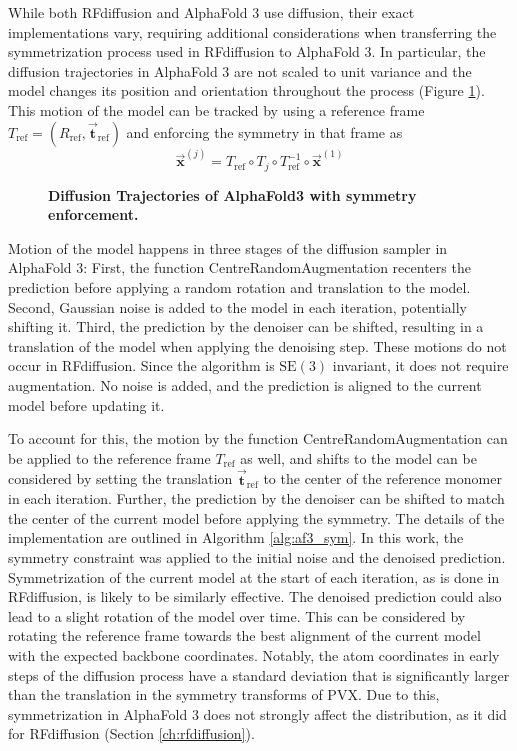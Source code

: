 While both RFdiffusion and AlphaFold 3 use diffusion, their exact implementations vary, requiring additional considerations when transferring the symmetrization process used in RFdiffusion to AlphaFold 3. In particular, the diffusion trajectories in AlphaFold 3 are not scaled to unit variance and the model changes its position and orientation throughout the process (Figure \ref{fig:af3_sym_traj}). This motion of the model can be tracked by using a reference frame $T_{\text{ref}} = (R_{\text{ref}}, \vec{\mathbf{t}}_{\text{ref}})$ and enforcing the symmetry in that frame as 
\begin{equation}
\vec{\mathbf{x}}^{(j)} = T_{\text{ref}} \circ T_j \circ T_{\text{ref}}^{-1} \circ \vec{\mathbf{x}}^{(1)}
\end{equation}

\begin{figure}[!htb]

\caption{\textbf{Diffusion Trajectories of AlphaFold3 with symmetry enforcement. }}
\label{fig:af3_sym_traj}
\end{figure}

Motion of the model happens in three stages of the diffusion sampler in AlphaFold 3: First, the function CentreRandomAugmentation recenters the prediction before applying a random rotation and translation to the model. Second, Gaussian noise is added to the model in each iteration, potentially shifting it. Third, the prediction by the denoiser can be shifted, resulting in a translation of the model when applying the denoising step. These motions do not occur in RFdiffusion. Since the algorithm is $\mathrm{SE}(3)$ invariant, it does not require augmentation. No noise is added, and the prediction is aligned to the current model before updating it. 


To account for this, the motion by the function CentreRandomAugmentation can be applied to the reference frame $T_\text{ref}$ as well, and shifts to the model can be considered by setting the translation $\vec{\mathbf{t}}_{\text{ref}}$ to the center of the reference monomer in each iteration. Further, the prediction by the denoiser can be shifted to match the center of the current model before applying the symmetry. The details of the implementation are outlined in Algorithm \ref{alg:af3_sym}. In this work, the symmetry constraint was applied to the initial noise and the denoised prediction. Symmetrization of the current model at the start of each iteration, as is done in RFdiffusion, is likely to be similarly effective. The denoised prediction could also lead to a slight rotation of the model over time. This can be considered by rotating the reference frame towards the best alignment of the current model with the expected backbone coordinates. Notably, the atom coordinates in early steps of the diffusion process have a standard deviation that is significantly larger than the translation in the symmetry transforms of PVX. Due to this, symmetrization in AlphaFold 3 does not strongly affect the distribution, as it did for RFdiffusion (Section \ref{ch:rfdiffusion}).




